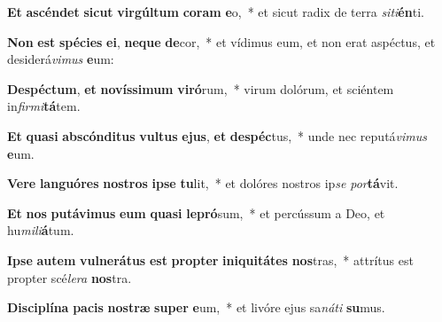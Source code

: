\item \textbf{Et} \textbf{a}\textbf{scén}\textbf{det} \textbf{sic}\textbf{ut} \textbf{vir}\textbf{gúl}\textbf{tum} \textbf{co}\textbf{ram} \textbf{e}o,~* et sicut radix de terra \textit{si}\textit{ti}\textbf{én}ti.
\item \textbf{Non} \textbf{est} \textbf{spé}\textbf{ci}\textbf{es} \textbf{e}\textbf{i}, \textbf{ne}\textbf{que} \textbf{de}cor,~* et vídimus eum, et non erat aspéctus, et desiderá\textit{vi}\textit{mus} \textbf{e}um:
\item \textbf{De}\textbf{spéc}\textbf{tum}, \textbf{et} \textbf{no}\textbf{vís}\textbf{si}\textbf{mum} \textbf{vi}\textbf{ró}rum,~* virum dolórum, et sciéntem in\textit{fir}\textit{mi}\textbf{tá}tem.
\item \textbf{Et} \textbf{qua}\textbf{si} \textbf{abs}\textbf{cón}\textbf{di}\textbf{tus} \textbf{vul}\textbf{tus} \textbf{e}\textbf{jus}, \textbf{et} \textbf{de}\textbf{spéc}tus,~* unde nec reputá\textit{vi}\textit{mus} \textbf{e}um.
\item \textbf{Ve}\textbf{re} \textbf{lan}\textbf{guó}\textbf{res} \textbf{nos}\textbf{tros} \textbf{ip}\textbf{se} \textbf{tu}lit,~* et dolóres nostros ip\textit{se} \textit{por}\textbf{tá}vit.
\item \textbf{Et} \textbf{nos} \textbf{pu}\textbf{tá}\textbf{vi}\textbf{mus} \textbf{e}\textbf{um} \textbf{qua}\textbf{si} \textbf{le}\textbf{pró}sum,~* et percússum a Deo, et hu\textit{mi}\textit{li}\textbf{á}tum.
\item \textbf{Ip}\textbf{se} \textbf{au}\textbf{tem} \textbf{vul}\textbf{ne}\textbf{rá}\textbf{tus} \textbf{est} \textbf{prop}\textbf{ter} \textbf{in}\textbf{i}\textbf{qui}\textbf{tá}\textbf{tes} \textbf{nos}tras,~* attrítus est propter scé\textit{le}\textit{ra} \textbf{nos}tra.
\item \textbf{Di}\textbf{sci}\textbf{plí}\textbf{na} \textbf{pa}\textbf{cis} \textbf{nos}\textbf{træ} \textbf{su}\textbf{per} \textbf{e}um,~* et livóre ejus sa\textit{ná}\textit{ti} \textbf{su}mus.
